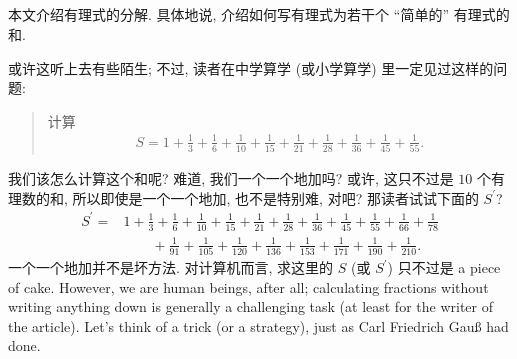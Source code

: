 \subsection*{\DecompositionOfRationalExpressions}
\markright{\DecompositionOfRationalExpressions}

本文介绍有理式的分解. 具体地说, 介绍如何写有理式为若干个 ``简单的'' 有理式的和.

或许这听上去有些陌生; 不过, 读者在中学算学 (或小学算学) 里一定见过这样的问题:
\begin{quotation}
    计算
    \begin{align*}
        S = 1 + \frac{1}{3} + \frac{1}{6} + \frac{1}{10} + \frac{1}{15} + \frac{1}{21} + \frac{1}{28} + \frac{1}{36} + \frac{1}{45} + \frac{1}{55}.
    \end{align*}
\end{quotation}
我们该怎么计算这个和呢? 难道, 我们一个一个地加吗? 或许, 这只不过是 $10$ 个有理数的和, 所以即使是一个一个地加, 也不是特别难, 对吧? 那读者试试下面的 $S^{\prime}$?
\begin{align*}
    S^{\prime}
    = {} & 1 + \frac{1}{3} + \frac{1}{6} + \frac{1}{10} + \frac{1}{15} + \frac{1}{21} + \frac{1}{28} + \frac{1}{36} + \frac{1}{45} + \frac{1}{55} + \frac{1}{66} + \frac{1}{78} \\
         & \qquad + \frac{1}{91} + \frac{1}{105} + \frac{1}{120} + \frac{1}{136} + \frac{1}{153} + \frac{1}{171} + \frac{1}{190} + \frac{1}{210}.
\end{align*}
一个一个地加并不是坏方法. 对计算机而言, 求这里的 $S$ (或 $S^{\prime}$) 只不过是 a piece of cake. However, we are human beings, after all; calculating fractions without writing anything down is generally a challenging task (at least for the writer of the article). Let's think of a trick (or a strategy), just as Carl Friedrich Gauß had done.

